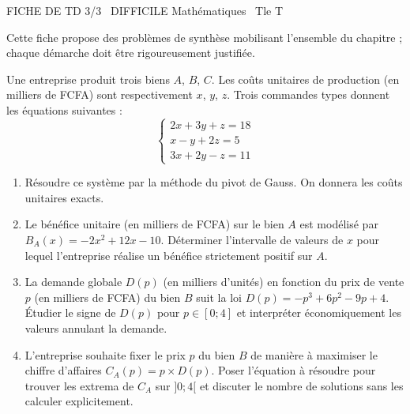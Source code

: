 \documentclass[11pt]{article}
\begin{document}
\begin{tcolorbox}[enhanced,colback=popink,colframe=popink,arc=10pt,boxrule=0pt,left=12pt,right=12pt,top=9pt,bottom=9pt]
{\color{white}\popxbold\small FICHE DE TD 3/3 \textbullet\ DIFFICILE \hfill Mathématiques \textbullet\ Tle T\par}
\end{tcolorbox}
\vspace{4pt}
Cette fiche propose des problèmes de synthèse mobilisant l'ensemble du chapitre ; chaque démarche doit être rigoureusement justifiée.

\begin{exercice}
Une entreprise produit trois biens $A$, $B$, $C$. Les coûts unitaires de production (en milliers de FCFA) sont respectivement $x$, $y$, $z$. Trois commandes types donnent les équations suivantes :
\[
\begin{cases}
2x + 3y + z = 18 \\
x - y + 2z = 5 \\
3x + 2y - z = 11
\end{cases}
\]
\begin{enumerate}
    \item Résoudre ce système par la méthode du pivot de Gauss. On donnera les coûts unitaires exacts.
    \item Le bénéfice unitaire (en milliers de FCFA) sur le bien $A$ est modélisé par $B_A(x) = -2x^2 + 12x - 10$. Déterminer l'intervalle de valeurs de $x$ pour lequel l'entreprise réalise un bénéfice strictement positif sur $A$.
    \item La demande globale $D(p)$ (en milliers d'unités) en fonction du prix de vente $p$ (en milliers de FCFA) du bien $B$ suit la loi $D(p) = -p^3 + 6p^2 - 9p + 4$. Étudier le signe de $D(p)$ pour $p \in [0; 4]$ et interpréter économiquement les valeurs annulant la demande.
    \item L'entreprise souhaite fixer le prix $p$ du bien $B$ de manière à maximiser le chiffre d'affaires $C_A(p) = p \times D(p)$. Poser l'équation à résoudre pour trouver les extrema de $C_A$ sur $]0; 4[$ et discuter le nombre de solutions sans les calculer explicitement.
\end{enumerate}
\end{exercice}
\end{document}
